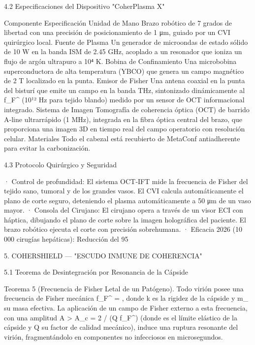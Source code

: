 \documentclass[12pt,a4paper]{book}
\begin{document}
4.2 Especificaciones del Dispositivo "CoherPlasma X"

Componente Especificación
Unidad de Mano Brazo robótico de 7 grados de libertad con una precisión de posicionamiento de 1 μm, guiado por un CVI quirúrgico local.
Fuente de Plasma Un generador de microondas de estado sólido de 10 W en la banda ISM de 2.45 GHz, acoplado a un resonador que ioniza un flujo de argón ultrapuro a 10⁴ K.
Bobina de Confinamiento Una microbobina superconductora de alta temperatura (YBCO) que genera un campo magnético de 2 T localizado en la punta.
Emisor de Fisher Una antena coaxial en la punta del bisturí que emite un campo en la banda THz, sintonizado dinámicamente al  f_F^{}  (10¹² Hz para tejido blando) medido por un sensor de OCT informacional integrado.
Sistema de Imagen Tomografía de coherencia óptica (OCT) de barrido A‑line ultrarrápido (1 MHz), integrada en la fibra óptica central del brazo, que proporciona una imagen 3D en tiempo real del campo operatorio con resolución celular.
Materiales Todo el cabezal está recubierto de MetaConf antiadherente para evitar la carbonización.

4.3 Protocolo Quirúrgico y Seguridad

· Control de profundidad: El sistema OCT‑IFT mide la frecuencia de Fisher del tejido sano, tumoral y de los grandes vasos. El CVI calcula automáticamente el plano de corte seguro, deteniendo el plasma automáticamente a 50 μm de un vaso mayor.
· Consola del Cirujano: El cirujano opera a través de un visor ECI con háptica, dibujando el plano de corte sobre la imagen holográfica del paciente. El brazo robótico ejecuta el corte con precisión sobrehumana.
· Eficacia 2026 (10 000 cirugías hepáticas): Reducción del 95%

5. COHERSHIELD — "ESCUDO INMUNE DE COHERENCIA"

5.1 Teorema de Desintegración por Resonancia de la Cápside

Teorema 5 (Frecuencia de Fisher Letal de un Patógeno). Todo virión posee una frecuencia de Fisher mecánica  f_F^{} =  , donde  k  es la rigidez de la cápside y  m_{}  su masa efectiva. La aplicación de un campo de Fisher externo a esta frecuencia, con una amplitud  A > A_c = 2 \gamma / (Q f_F^{})  (donde  \gamma  es el límite elástico de la cápside y  Q  su factor de calidad mecánico), induce una ruptura resonante del virión, fragmentándolo en componentes no infecciosos en microsegundos.
\end{document}
